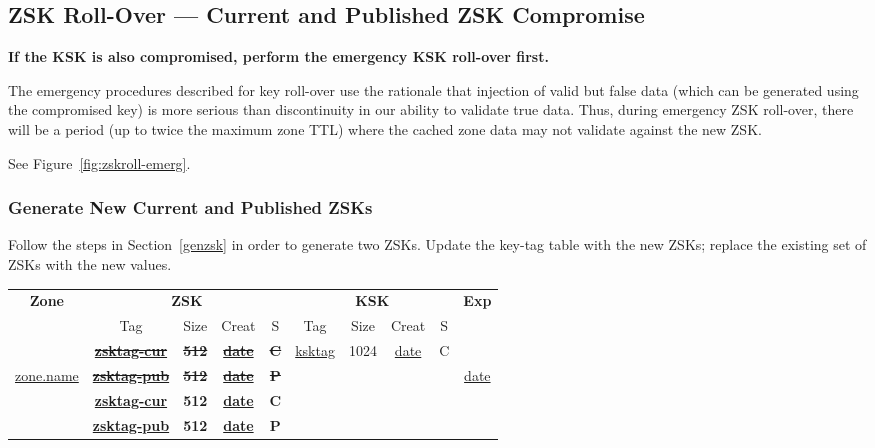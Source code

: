 
\clearpage
\subsection{ZSK Roll-Over --- Current and Published ZSK Compromise}
\label{roll-emergency-zsks}

{\bf If the KSK is also compromised, perform the emergency KSK roll-over first.}

The emergency procedures described for key roll-over use the rationale that
injection of valid but false data (which can be generated using the
compromised key) is more serious than discontinuity in our ability to validate
true data. Thus, during emergency ZSK roll-over, there will be a period (up
to twice the maximum zone TTL) where the cached zone data may not validate
against the new ZSK.

See Figure~\ref{fig:zskroll-emerg}.


\subsubsection{Generate New Current and Published ZSKs}
\label{regen-zsks}

Follow the steps in Section~\ref{genzsk} in order to generate two ZSKs.
Update the key-tag table with the new ZSKs; replace the existing
set of ZSKs with the new values.

\begin{center}
\begin{tabular}{|c|c|c|c|c|c|c|c|c|c|}
\hline
{\bf Zone} &
\multicolumn{4}{c|}{{\bf ZSK}} &
\multicolumn{4}{c|}{{\bf KSK}} &
{\bf Exp} \\
\cline{2-9}

 & Tag & Size & Creat & S & Tag & Size & Creat & S & \\
\hline

					&
{\bf \sout{\underline{zsktag-cur}}}	&
{\bf \sout{512}}			&
{\bf \sout{\underline{date}}}		&
{\bf \sout{C}}				&
\underline{ksktag}			&
1024					&
\underline{date}			&
C					&
					\\

\cline{2-9}

\underline{zone.name}			&
{\bf \sout{\underline{zsktag-pub}}}	&
{\bf \sout{512}}			&
{\bf \sout{\underline{date}}}		&
{\bf \sout{P}}				&
					& & & &
\underline{date}			\\

\cline{2-9}
				&
{\bf \underline{zsktag-cur}}	&
{\bf 512}			&
{\bf \underline{date}}		&
{\bf C}				&
& & & & \\

\cline{2-9}

				&
{\bf \underline{zsktag-pub}}	&
{\bf 512}			&
{\bf \underline{date}}		&
{\bf P}				&
& & & & \\

\hline
\end{tabular}
\end{center}

